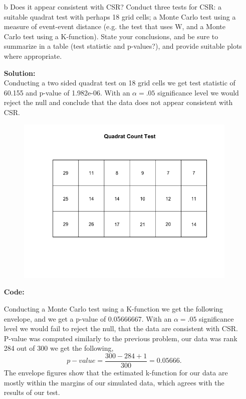 \documentclass[12pt]{article}
\makeatletter
\theoremstyle{homework}
\newenvironment{exercise}[1]
{\def\@currentlabel{#1}\exercisecore}
{\endexercisecore}
\newcommand{\localhead}[1]{\par\smallskip\noindent\textbf{#1}\nobreak\\}%
\newcommand\solution{\localhead{Solution:}}
\makeatother
\begin{document}
\begin{exercise}{7}
\begin{enumerate}
    \item[b] Does it appear consistent with CSR? Conduct three tests for CSR: a 
    suitable quadrat test with perhaps 18 grid cells; a Monte Carlo test using a
    measure of event-event distance (e.g. the test that uses W, and a Monte
    Carlo test using a K-function). State your conclusions, and be sure to
    summarize in a table (test statistic and p-values?), and provide suitable
    plots where appropriate.\\
    \solution Conducting a two sided quadrat test on 18 grid cells we get test statistic of 60.155 and p-value of 1.982e-06. With an $\alpha = .05$ significance 
    level we would reject the null and conclude that the data does not appear consistent with CSR. 
    \begin{figure}[H]
      \begin{center}
      \includegraphics[width = .9\textwidth]{Rplot01.png}
      \end{center}
    \end{figure} 
    \textbf{Code:}
    \begin{center}
    
    \end{center}

    Conducting a Monte Carlo test using a K-function we get the following envelope, and we get a p-value of 0.05666667. With an $\alpha = .05$ significance level we would fail to 
    reject the null, that the data are consistent with CSR. P-value was computed similarly to the previous problem, our data was rank 284 out of 300 we get the following, 
    \begin{equation*}
      p-value = \dfrac{300 - 284 + 1}{300} = 0.05666.
    \end{equation*}
    The envelope figures show that the estimated k-function for our data are mostly within the margins of our simulated data, which agrees with the results of our test. 


\end{enumerate}
\end{exercise}
\end{document}
